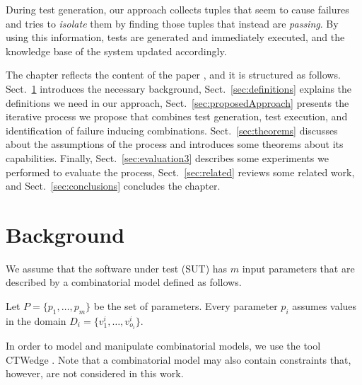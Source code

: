 \begin{tikzborder}{\cite{Gargantini16:validation}}
\begin{tikzborder}{\cite{gargantini_combinatorial_2017}}
\begin{tikzborder}{\cite{gargantini_combinatorial_2017}}
\begin{tikzborder}{\cite{garn2019}}
\begin{tikzborder}{\cite{arcaini2019achieving}}
During test generation, our approach collects tuples that seem to cause failures and tries to \emph{isolate} them by finding those tuples that instead are \emph{passing}. By using this information, tests are generated and immediately executed, and the knowledge base of the system updated accordingly.

The chapter reflects the content of the paper \cite{iwct19}, and it is structured as follows. Sect.~\ref{sec:background} introduces the necessary background, Sect.~\ref{sec:definitions} explains the definitions we need in our approach, Sect.~\ref{sec:proposedApproach} presents the iterative process we propose that combines test generation, test execution, and identification of failure inducing combinations. Sect.~\ref{sec:theorems} discusses about the assumptions of the process and introduces some theorems about its capabilities. Finally, Sect.~\ref{sec:evaluation3} describes some experiments we performed to evaluate the process, Sect.~\ref{sec:related} reviews some related work, and Sect.~\ref{sec:conclusions} concludes the chapter.

\section{Background}\label{sec:background}

\begin{tikzborder}{\cite{iwct19}}
We assume that the software under test (SUT) has $m$ input parameters that are described by a combinatorial model defined as follows.

\begin{defn}\label{def:combModel}
	Let $P = \{p_1, \dots , p_m\}$ be the set of parameters. Every parameter $p_i$ assumes values in the domain $D_i = \{v^i_1, \dots , v^i_{o_i}\}$.
\end{defn}

In order to model and manipulate combinatorial models, we use the tool CTWedge \cite{IWCTGargantini2018}. Note that a combinatorial model may also contain constraints that, however, are not considered in this work.


\end{tikzborder}
\end{tikzborder}
\end{tikzborder}
\end{tikzborder}
\end{tikzborder}
\end{tikzborder}
